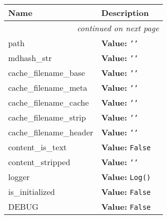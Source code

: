     \vspace{-1cm}
\hspace{\varindent}\begin{longtable}{|p{\varnamewidth}|p{\vardescrwidth}|l}
\cline{1-2}
\cline{1-2} \centering \textbf{Name} & \centering \textbf{Description}& \\
\cline{1-2}
\endhead\cline{1-2}\multicolumn{3}{r}{\small\textit{continued on next page}}\\\endfoot\cline{1-2}
\endlastfoot\raggedright p\-a\-t\-h\- & \raggedright \textbf{Value:} 
{\tt \texttt{'}\texttt{}\texttt{'}}&\\
\cline{1-2}
\raggedright m\-d\-5\-h\-a\-s\-h\-\_\-s\-t\-r\- & \raggedright \textbf{Value:} 
{\tt \texttt{'}\texttt{}\texttt{'}}&\\
\cline{1-2}
\raggedright c\-a\-c\-h\-e\-\_\-f\-i\-l\-e\-n\-a\-m\-e\-\_\-b\-a\-s\-e\- & \raggedright \textbf{Value:} 
{\tt \texttt{'}\texttt{}\texttt{'}}&\\
\cline{1-2}
\raggedright c\-a\-c\-h\-e\-\_\-f\-i\-l\-e\-n\-a\-m\-e\-\_\-m\-e\-t\-a\- & \raggedright \textbf{Value:} 
{\tt \texttt{'}\texttt{}\texttt{'}}&\\
\cline{1-2}
\raggedright c\-a\-c\-h\-e\-\_\-f\-i\-l\-e\-n\-a\-m\-e\-\_\-c\-a\-c\-h\-e\- & \raggedright \textbf{Value:} 
{\tt \texttt{'}\texttt{}\texttt{'}}&\\
\cline{1-2}
\raggedright c\-a\-c\-h\-e\-\_\-f\-i\-l\-e\-n\-a\-m\-e\-\_\-s\-t\-r\-i\-p\- & \raggedright \textbf{Value:} 
{\tt \texttt{'}\texttt{}\texttt{'}}&\\
\cline{1-2}
\raggedright c\-a\-c\-h\-e\-\_\-f\-i\-l\-e\-n\-a\-m\-e\-\_\-h\-e\-a\-d\-e\-r\- & \raggedright \textbf{Value:} 
{\tt \texttt{'}\texttt{}\texttt{'}}&\\
\cline{1-2}
\raggedright c\-o\-n\-t\-e\-n\-t\-\_\-i\-s\-\_\-t\-e\-x\-t\- & \raggedright \textbf{Value:} 
{\tt False}&\\
\cline{1-2}
\raggedright c\-o\-n\-t\-e\-n\-t\-\_\-s\-t\-r\-i\-p\-p\-e\-d\- & \raggedright \textbf{Value:} 
{\tt \texttt{'}\texttt{}\texttt{'}}&\\
\cline{1-2}
\raggedright l\-o\-g\-g\-e\-r\- & \raggedright \textbf{Value:} 
{\tt Log()}&\\
\cline{1-2}
\raggedright i\-s\-\_\-i\-n\-i\-t\-i\-a\-l\-i\-z\-e\-d\- & \raggedright \textbf{Value:} 
{\tt False}&\\
\cline{1-2}
\raggedright D\-E\-B\-U\-G\- & \raggedright \textbf{Value:} 
{\tt False}&\\
\cline{1-2}
\end{longtable}

